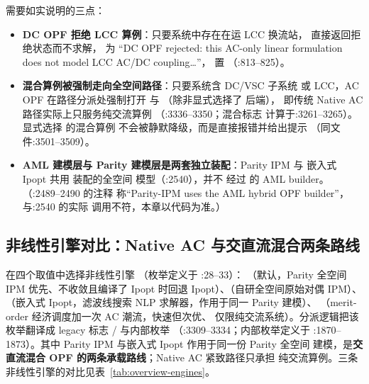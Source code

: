 需要如实说明的三点：

\begin{itemize}
  \item \textbf{DC OPF 拒绝 LCC 算例}：只要系统中存在在运 LCC 换流站，
         直接返回拒绝状态而不求解， 为
        ``DC OPF rejected: this AC-only linear formulation does not model
        LCC AC/DC coupling\ldots''， 置
        （:813--825）。
  \item \textbf{混合算例被强制走向全空间路径}：只要系统含 DC/VSC 子系统
        或 LCC，AC OPF 在路径分派处强制打开  与
        （除非显式选择了  后端），
        即传统 Native AC 路径实际上只服务纯交流算例
        （:3336--3350；混合标志
        计算于:3261--3265）。显式选择  的混合算例
        不会被静默降级，而是直接报错并给出提示
        （同文件:3501--3509）。
  \item \textbf{AML 建模层与 Parity 建模层是两套独立装配}：Parity IPM 与
        嵌入式 Ipopt 共用  装配的全空间
        模型（:2540），并不
        经过  的 AML builder。
        （:2489--2490 的注释
        称“Parity-IPM uses the AML hybrid OPF builder”，与:2540 的实际
        调用不符，本章以代码为准。）
\end{itemize}

\subsection{非线性引擎对比：Native AC 与交直流混合两条路线}\label{subsec:overview-engines}

 在四个取值中选择非线性引擎
（枚举定义于
:28--33）：
（默认，Parity 全空间 IPM 优先、不收敛且编译了 Ipopt 时回退
Ipopt）、（自研全空间原始对偶 IPM）、（嵌入式
Ipopt，滤波线搜索 NLP 求解器，作用于同一 Parity 建模）、
（merit-order 经济调度加一次 AC 潮流，快速但次优、
仅限纯交流系统）。分派逻辑把该枚举翻译成 legacy 标志
/ 与内部枚举
（:3309--3334；内部枚举定义于
:1870--1873）。其中 Parity IPM 与嵌入式 Ipopt 作用于同一份 Parity 全空间
建模，是\textbf{交直流混合 OPF 的两条承载路线}；Native AC 紧致路径只承担
纯交流算例。三条非线性引擎的对比见表~\ref{tab:overview-engines}。


